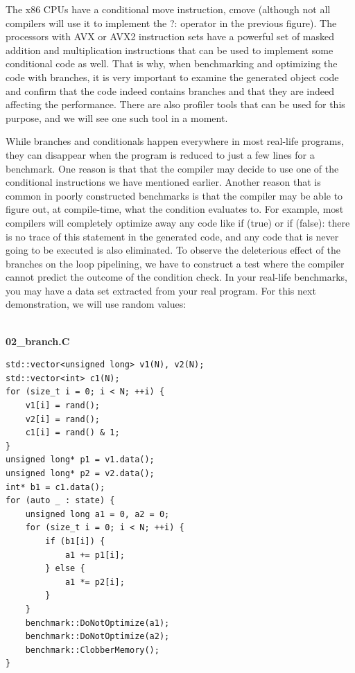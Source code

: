 The x86 CPUs have a conditional move instruction, cmove (although not all compilers will use it to implement the ?: operator in the previous figure). The processors with AVX or AVX2 instruction sets have a powerful set of masked addition and multiplication instructions that can be used to implement some conditional code as well. That is why, when benchmarking and optimizing the code with branches, it is very important to examine the generated object code and confirm that the code indeed contains branches and that they are indeed affecting the performance. There are also profiler tools that can be used for this purpose, and we will see one such tool in a moment.

While branches and conditionals happen everywhere in most real-life programs, they can disappear when the program is reduced to just a few lines for a benchmark. One reason is that that the compiler may decide to use one of the conditional instructions we have mentioned earlier. Another reason that is common in poorly constructed benchmarks is that the compiler may be able to figure out, at compile-time, what the condition evaluates to. For example, most compilers will completely optimize away any code like if (true) or if (false): there is no trace of this statement in the generated code, and any code that is never going to be executed is also eliminated. To observe the deleterious effect of the branches on the loop pipelining, we have to construct a test where the compiler cannot predict the outcome of the condition check. In your real-life benchmarks, you may have a data set extracted from your real program. For this next demonstration, we will use random values:

\hspace*{\fill} \\ %
\noindent
\textbf{02\_branch.C}
\begin{lstlisting}[style=styleCXX]
std::vector<unsigned long> v1(N), v2(N);
std::vector<int> c1(N);
for (size_t i = 0; i < N; ++i) {
	v1[i] = rand();
	v2[i] = rand();
	c1[i] = rand() & 1;
}
unsigned long* p1 = v1.data();
unsigned long* p2 = v2.data();
int* b1 = c1.data();
for (auto _ : state) {
	unsigned long a1 = 0, a2 = 0;
	for (size_t i = 0; i < N; ++i) {
		if (b1[i]) {
			a1 += p1[i];
		} else {
			a1 *= p2[i];
		}
	}
	benchmark::DoNotOptimize(a1);
	benchmark::DoNotOptimize(a2);
	benchmark::ClobberMemory();
}
\end{lstlisting}

